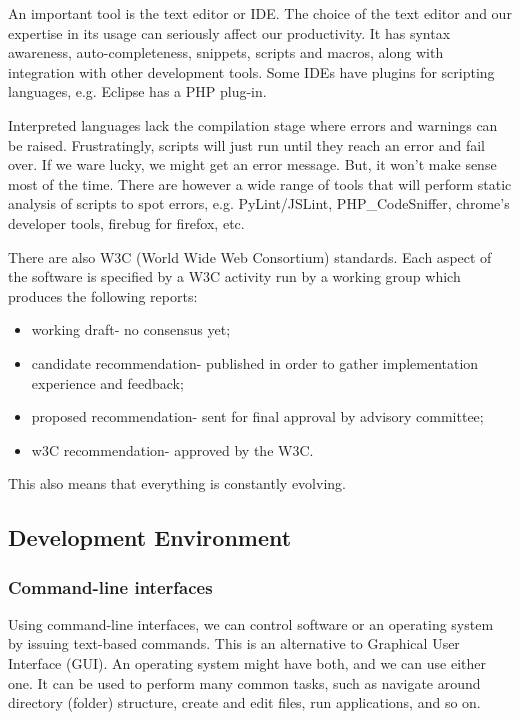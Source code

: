 \documentclass[a4paper, openany]{memoir}
\begin{document}
    An important tool is the text editor or IDE. The choice of the text editor and our expertise in its usage can seriously affect our productivity. It has syntax awareness, auto-completeness, snippets, scripts and macros, along with integration with other development tools. Some IDEs have plugins for scripting languages, e.g. Eclipse has a PHP plug-in.

    Interpreted languages lack the compilation stage where errors and warnings can be raised. Frustratingly, scripts will just run until they reach an error and fail over. If we ware lucky, we might get an error message. But, it won't make sense most of the time. There are however a wide range of tools that will perform static analysis of scripts to spot errors, e.g. PyLint/JSLint, PHP\_CodeSniffer, chrome's developer tools, firebug for firefox, etc.

    There are also W3C (World Wide Web Consortium) standards. Each aspect of the software is specified by a W3C activity run by a working group which produces the following reports:
    \begin{itemize}
        \item working draft- no consensus yet;
        \item candidate recommendation- published in order to gather implementation experience and feedback;
        \item proposed recommendation- sent for final approval by advisory committee;
        \item w3C recommendation- approved by the W3C.
    \end{itemize}
    This also means that everything is constantly evolving.

    \subsection{Development Environment}
    \subsubsection{Command-line interfaces}
    Using command-line interfaces, we can control software or an operating system by issuing text-based commands. This is an alternative to Graphical User Interface (GUI). An operating system might have both, and we can use either one. It can be used to perform many common tasks, such as navigate around directory (folder) structure, create and edit files, run applications, and so on.
\end{document}
